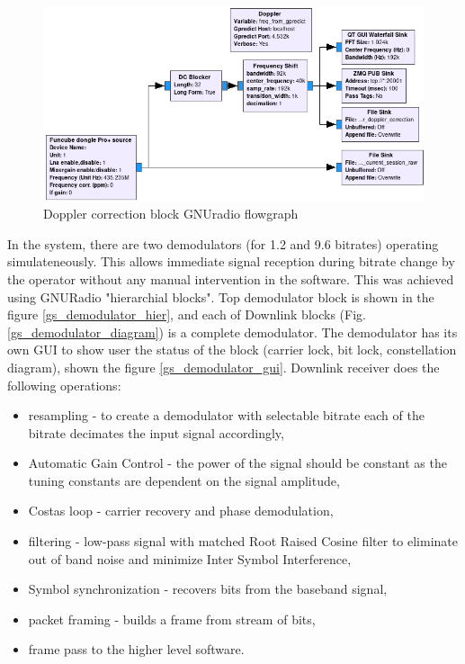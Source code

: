 \begin{figure}
    \centering
    \includegraphics[width=0.7\paperwidth]{img/5/gs_doppler_gnuradio.png}
    \caption{Doppler correction block GNUradio flowgraph}
    \label{gs_doppler_gnuradio}
\end{figure}

In the system, there are two demodulators (for \SI{1.2}{\kbps} and \SI{9.6}{\kbps} bitrates) operating simulateneously. This allows immediate signal reception during bitrate change by the operator without any manual intervention in the software. This was achieved using GNURadio "hierarchial blocks". Top demodulator block is shown in the figure \ref{gs_demodulator_hier}, and each of Downlink blocks (Fig. \ref{gs_demodulator_diagram}) is a complete demodulator. The demodulator has its own GUI to show user the status of the block (carrier lock, bit lock, constellation diagram), shown the figure \ref{gs_demodulator_gui}.
Downlink receiver does the following operations:
\begin{itemize}
    \item resampling - to create a demodulator with selectable bitrate each of the bitrate decimates the input signal accordingly,
    \item Automatic Gain Control - the power of the signal should be constant as the tuning constants are dependent on the signal amplitude,
    \item Costas loop - carrier recovery and phase demodulation,
    \item filtering - low-pass signal with matched Root Raised Cosine filter to eliminate out of band noise and minimize Inter Symbol Interference,
    \item Symbol synchronization - recovers bits from the baseband signal,
    \item packet framing - builds a frame from stream of bits,
    \item frame pass to the higher level software.
\end{itemize}


